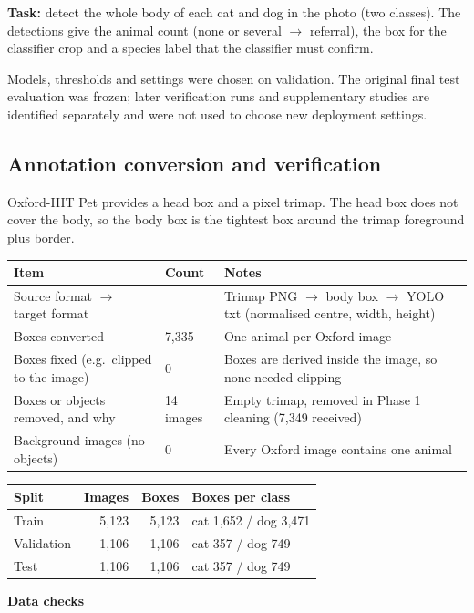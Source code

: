 \documentclass[11pt,a4paper]{article}
\begin{document}
\textbf{Task:} detect the whole body of each cat and dog in the photo (two classes). The detections give the animal count (none or several $\rightarrow$ referral), the box for the classifier crop and a species label that the classifier must confirm.

Models, thresholds and settings were chosen on validation. The original final test evaluation was frozen; later verification runs and supplementary studies are identified separately and were not used to choose new deployment settings.

\subsection{Annotation conversion and verification}

Oxford-IIIT Pet provides a head box and a pixel trimap. The head box does not cover the body, so the body box is the tightest box around the trimap foreground plus border.

\begin{tabularx}{\linewidth}{@{}Y l Y@{}}
\toprule
Item & Count & Notes \\
\midrule
Source format $\rightarrow$ target format & -- & Trimap PNG $\rightarrow$ body box $\rightarrow$ YOLO txt (normalised centre, width, height) \\
Boxes converted & 7,335 & One animal per Oxford image \\
Boxes fixed (e.g.\ clipped to the image) & 0 & Boxes are derived inside the image, so none needed clipping \\
Boxes or objects removed, and why & 14 images & Empty trimap, removed in Phase 1 cleaning (7,349 received) \\
Background images (no objects) & 0 & Every Oxford image contains one animal \\
\bottomrule
\end{tabularx}

\medskip
\begin{tabularx}{\linewidth}{@{}l r r Y@{}}
\toprule
Split & Images & Boxes & Boxes per class \\
\midrule
Train & 5,123 & 5,123 & cat 1,652 / dog 3,471 \\
Validation & 1,106 & 1,106 & cat 357 / dog 749 \\
Test & 1,106 & 1,106 & cat 357 / dog 749 \\
\bottomrule
\end{tabularx}

\medskip
\textbf{Data checks}
\end{document}
